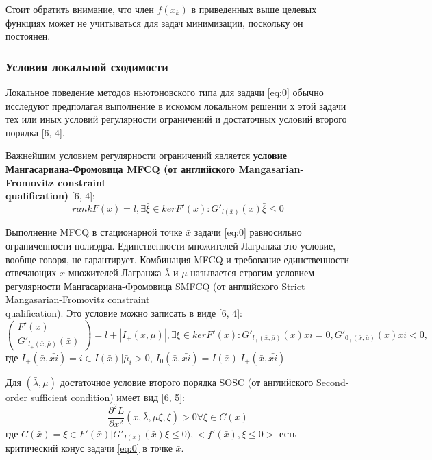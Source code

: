 \documentclass[12pt,a4paper]{article}
\begin{document}
Стоит обратить внимание, что член $f(x_{k})$ в приведенных выше целевых функциях может не учитываться для задач минимизации, поскольку он постоянен.

\subsubsection{Условия локальной сходимости}
Локальное поведение методов ньютоновского типа для задачи \ref{eq:0} обычно исследуют предполагая выполнение в искомом локальном решении $х$ этой задачи тех или иных условий регулярности ограничений и достаточных условий второго порядка [6, 4].
	
Важнейшим условием регулярности ограничений является \textbf{условие Мангасариана-Фромовица MFCQ (от английского Mangasarian-Fromovitz constraint\\qualification)} [6, 4]:
	$$
		rank F(\bar{x}) = l, \exists\bar\xi \in kerF'(\bar{x}) : G'_{l(\bar{x})}(\bar{x})\bar{\xi} \leq 0 
	$$

Выполнение MFCQ в стационарной точке $\bar{x}$ задачи \ref{eq:0} равносильно ограниченности полиэдра. Единственности множителей Лагранжа это условие, вообще говоря, не гарантирует. Комбинация MFCQ и требование единственности отвечающих $\bar{x}$ множителей Лагранжа $\bar{\lambda}$ и $\bar{\mu}$ называется строгим условием регулярности Мангасариана-Фромовица SMFCQ (от английского Strict Mangasarian-Fromovitz constraint\\qualification). Это условие можно записать в виде [6, 4]:
	\begin{equation}
		\begin{pmatrix}
		F'(x)\\
			G'_{l_{+}(\bar{x}, \bar{\mu})}(\bar{x})
		\end{pmatrix} = l + |I_{+}(\bar{x}, \bar{\mu})|,
	\exists \xi \in kerF'(\bar{x}): 	G'_{l_{+}(\bar{x}, \bar{\mu})}(\bar{x})\bar{xi} = 0, 	G'_{0_{+}(\bar{x}, \bar{\mu})}(\bar{x})\bar{xi} < 0,
	\end{equation}
где 
$I_+(\bar{x},\bar{xi}) = {i \in I(\bar{x})|\bar{\mu}_i > 0}$, 
$ I_0(\bar{x},\bar{xi}) = I(\bar{x}) \ I_+(\bar{x},\bar{xi})$	

Для $(\bar{\lambda}, \bar{\mu})$ достаточное условие второго порядка SOSC (от английского Second-order sufficient condition) имеет вид [6, 5]:
	\begin{equation}
		\frac{\partial^2 L}{\partial x^2}(\bar{x}, \bar{\lambda}, \bar{\mu}\xi, \xi) > 0 \forall\xi \in C(\bar{x})	
	\end{equation}	 
	где $C(\bar{x}) = {\xi \in F'(\bar{x})|G'_{I(\bar{x})}(\bar{x})\xi \leq 0)}, <f'(\bar{x}), \xi\leq 0>$ есть критический конус задачи \ref{eq:0} в точке $\bar{x}$.
\end{document}
